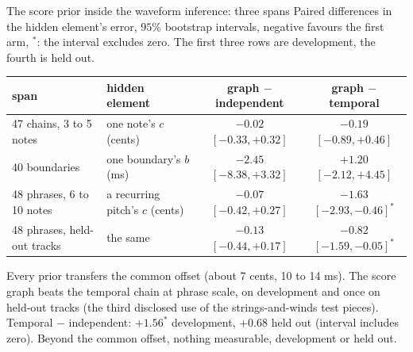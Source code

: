 \documentclass[aspectratio=169,11pt]{beamer}
\begin{document}
\begin{frame}{The score prior inside the waveform inference: three spans}
  \small
  Paired differences in the hidden element's error, $95\%$ bootstrap
  intervals, negative favours the first arm, $^{*}$: the interval
  excludes zero. The first three rows are development, the fourth is
  held out.
  \begin{center}
  \scriptsize
  \setlength{\tabcolsep}{3pt}
  \begin{tabular}{@{}llcc@{}}
    \toprule
    span & hidden element & graph $-$ independent & graph $-$ temporal \\
    \midrule
    47 chains, 3 to 5 notes & one note's $c$ (cents) & $-0.02$ $[-0.33,+0.32]$ & $-0.19$ $[-0.89,+0.46]$ \\
    40 boundaries & one boundary's $b$ (ms) & $-2.45$ $[-8.38,+3.32]$ & $+1.20$ $[-2.12,+4.45]$ \\
    48 phrases, 6 to 10 notes & a recurring pitch's $c$ (cents) & $-0.07$ $[-0.42,+0.27]$ & $-1.63$ $[-2.93,-0.46]^{*}$ \\
    48 phrases, held-out tracks & the same & $-0.13$ $[-0.44,+0.17]$ & $-0.82$ $[-1.59,-0.05]^{*}$ \\
    \bottomrule
  \end{tabular}
  \end{center}
  Every prior transfers the common offset (about 7 cents, 10 to 14 ms).
  The score graph beats the temporal chain at phrase scale, on
  development and once on held-out tracks (the third disclosed use of
  the strings-and-winds test pieces). Temporal $-$ independent:
  $+1.56^{*}$ development, $+0.68$ held out (interval includes zero).
  Beyond the common offset, nothing measurable, development or held out.
\end{frame}
\end{document}
